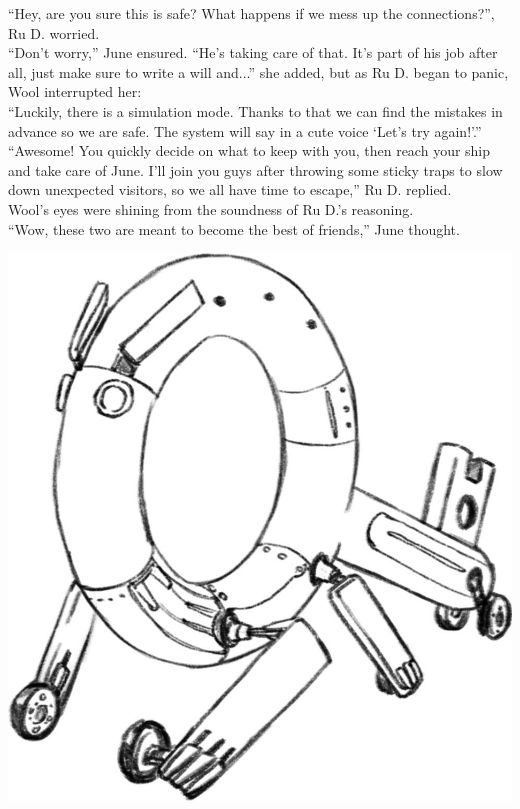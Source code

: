 ``Hey, are you sure this is safe? What happens if we mess up the connections?'', Ru D. worried.\\
``Don't worry,'' June ensured. ``He's taking care of that. It's part of his job after all, just make sure to write a will and...'' she added, but as Ru D. began to panic, Wool interrupted her:\\
``Luckily, there is a simulation mode. Thanks to that we can find the mistakes in advance so we are safe. The system will say in a cute voice `Let's try again!'.''\\
``Awesome! You quickly decide on what to keep with you, then reach your ship and take care of June. I'll join you guys after throwing some sticky traps to slow down unexpected visitors, so we all have time to escape,''  Ru D. replied.\\
Wool's eyes were shining from the soundness of Ru D.'s reasoning. \\
``Wow, these two are meant to become the best of friends,'' June thought.

\begin{center}
    \includegraphics[height=.2\textheight]{Assets/wfbw_ninja}    
\end{center}

